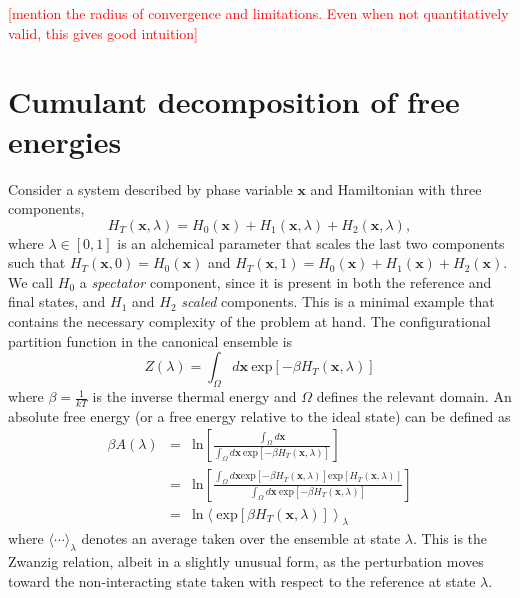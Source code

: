 \documentclass[%
 preprint,
 amsmath,amssymb,
 aps,
]{revtex4-1}
\newcommand{\warning}[1]{{\textsf{{\textcolor{red}{{[#1]}{}}}}}}
\renewcommand{\vec}[1]{{\mathbf{#1}}}
\begin{document}
\warning{mention the radius of convergence and limitations.  Even when not quantitatively valid, this gives good intuition}



\section{Cumulant decomposition of free energies}
\label{S:CumulantGeneral}

Consider a system described by phase variable $\vec{x}$ and Hamiltonian with three components,
\begin{equation}
H_T(\vec{x},\lambda) = H_0(\vec{x}) + H_1(\vec{x},\lambda) + H_2(\vec{x},\lambda),
\end{equation}
where $\lambda \in [ 0, 1] $ is an alchemical parameter that scales the last two components such that 
$
H_T(\vec{x},0) = H_0 (\vec{x})
$
and 
$
H_T(\vec{x},1) = H_0(\vec{x}) + H_1(\vec{x}) + H_2(\vec{x}).
$
We call $H_0$ a \emph{spectator} component, since it is present in both the reference and final states, and $H_1$ and $H_2$ \emph{scaled} components.  This is a minimal example that contains the necessary complexity of the problem at hand. 
The configurational partition function in the canonical ensemble is
\begin{equation}
Z(\lambda) = \int_{\Omega} d\vec{x} \: \mbox{exp} \left[  - \beta H_T (\vec{x},\lambda) \right]
\end{equation} 
where $\beta = \frac{1}{kT}$ is the inverse thermal energy and $\Omega$ defines the relevant domain.  An absolute free energy (or a free energy relative to the ideal state) can be defined as
\begin{eqnarray}
\beta A (\lambda) & = & \mbox{ln} \left[ \frac{\int_{\Omega} d\vec{x}}
{ \int_{\Omega} d\vec{x} \: \mbox{exp} \left[  - \beta H_T (\vec{x},\lambda) \right]}  \right] \\
& = &
\mbox{ln} \left[ \frac{\int_{\Omega} d\vec{x}  \mbox{exp} \left[  - \beta H_T (\vec{x},\lambda) \right] 
 \mbox{exp} \left[  H_T (\vec{x},\lambda) \right]}
{ \int_{\Omega} d\vec{x} \: \mbox{exp} \left[  -\beta H_T (\vec{x},\lambda) \right]}  \right] \\
& = & \mbox{ln} \left \langle  \mbox{exp} \left[ \beta H_T (\vec{x},\lambda) \right]
\right \rangle_{\lambda}
\label{e:Zwanzig}
\end{eqnarray}
where $\langle \cdots \rangle_{\lambda}$ denotes an average taken over the ensemble at state $\lambda$.  This is the
Zwanzig relation, albeit in a slightly unusual form, as the perturbation moves toward the non-interacting state 
taken with respect to the reference at state $\lambda$. 
\end{document}
